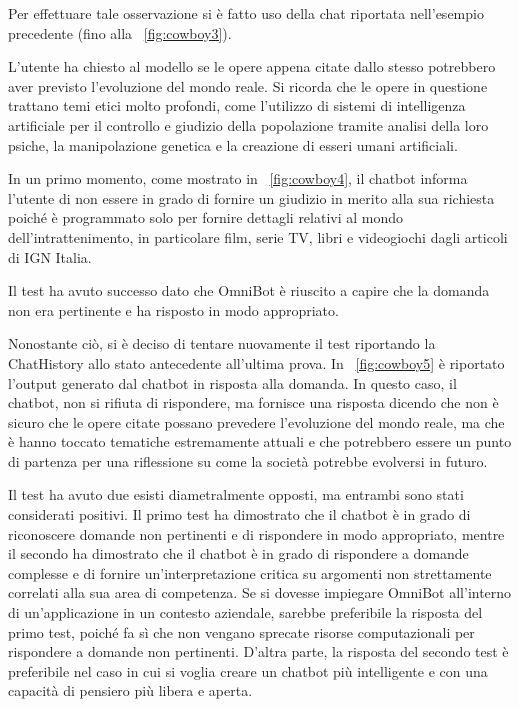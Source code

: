 Per effettuare tale osservazione si è fatto uso della chat riportata nell'esempio precedente (fino alla \figurename{~\ref{fig:cowboy3}}).

L'utente ha chiesto al modello se le opere appena citate dallo stesso potrebbero aver previsto l'evoluzione del mondo reale. Si ricorda che le opere in questione trattano temi etici molto profondi, come l'utilizzo di sistemi di intelligenza artificiale per il controllo e giudizio della popolazione tramite analisi della loro psiche, la manipolazione genetica e la creazione di esseri umani artificiali.

In un primo momento, come mostrato in \figurename{~\ref{fig:cowboy4}}, il chatbot informa l'utente di non essere in grado di fornire un giudizio in merito alla sua richiesta poiché è programmato solo per fornire dettagli relativi al mondo dell'intrattenimento, in particolare film, serie TV, libri e videogiochi dagli articoli di IGN Italia.

Il test ha avuto successo dato che OmniBot è riuscito a capire che la domanda non era pertinente e ha risposto in modo appropriato.

Nonostante ciò, si è deciso di tentare nuovamente il test riportando la ChatHistory allo stato antecedente all'ultima prova. In \figurename{~\ref{fig:cowboy5}} è riportato l'output generato dal chatbot in risposta alla domanda. In questo caso, il chatbot, non si rifiuta di rispondere, ma fornisce una risposta dicendo che non è sicuro che le opere citate possano prevedere l'evoluzione del mondo reale, ma che è hanno toccato tematiche estremamente attuali e che potrebbero essere un punto di partenza per una riflessione su come la società potrebbe evolversi in futuro.

Il test ha avuto due esisti diametralmente opposti, ma entrambi sono stati considerati positivi. Il primo test ha dimostrato che il chatbot è in grado di riconoscere domande non pertinenti e di rispondere in modo appropriato, mentre il secondo ha dimostrato che il chatbot è in grado di rispondere a domande complesse e di fornire un'interpretazione critica su argomenti non strettamente correlati alla sua area di competenza. Se si dovesse impiegare OmniBot all'interno di un'applicazione in un contesto aziendale, sarebbe preferibile la risposta del primo test, poiché fa sì che non vengano sprecate risorse computazionali per rispondere a domande non pertinenti.
D'altra parte, la risposta del secondo test è preferibile nel caso in cui si voglia creare un chatbot più intelligente e con una capacità di pensiero più libera e aperta.

